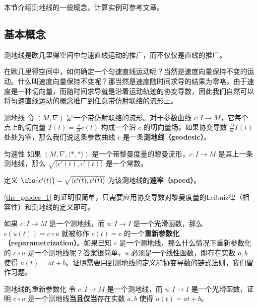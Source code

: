 

本节介绍测地线的一般概念，计算实例可参考文章。

\subsection{基本概念}

测地线是欧几里得空间中匀速直线运动的推广，而不仅仅是直线的推广。

在欧几里得空间中，如何确定一个匀速直线运动呢？当然是速度向量保持不变的运动。什么叫速度向量保持不变呢？那当然是速度随时间求导的结果为零咯。由于速度是一种切向量，而随时间求导就是沿着运动轨迹的协变导数，因此我们自然可以将匀速直线运动的概念推广到任意带仿射联络的流形上。

\begin{definition}{测地线}
令 $(M, \nabla)$ 是一个带仿射联络的流形。对于参数曲线 $c:I\to M$，它每个点上的切向量 $T(t)=\frac{\dd}{\dd t}c(t)$ 构成一个沿 $c$ 的切向量场。如果协变导数 $\frac{D}{\dd t}T(t)$ 处处为零，那么我们说这条参数曲线 $c$ 是一条\textbf{测地线（geodesic）}。
\end{definition}

\begin{theorem}{匀速性}\label{the_geodes_1}
如果 $(M, \nabla,  \langle *, * \rangle )$ 是一个带黎曼度量的黎曼流形，$c:I\to M$ 是其上一条测地线，那么 $\sqrt{ \langle c'(t), c'(t) \rangle }$ 是一个常数。

定义 $\abs{c'(t)}=\sqrt{ \langle c'(t), c'(t) \rangle }$ 为该测地线的\textbf{速率（speed）}。
\end{theorem}

\autoref{the_geodes_1} 的证明很简单，只需要应用协变导数对黎曼度量的Leibniz律（相容性）和测地线的定义即可。



如果 $c:I\to M$ 是一个测地线，而 $u:I\to I$ 是一个光滑函数，那么 $c(u(t))=c\circ u$ 就被称作 $c(t)=c$ 的一个\textbf{重新参数化（reparametrization）}。如果已知 $c$ 是一个测地线，那么什么情况下重新参数化的 $c\circ u$ 是一个测地线呢？答案很简单，$u$ 必须是一个线性函数，即存在实数 $a, b$ 使得 $u(t)=at+b$。证明需要用到测地线的定义和协变导数的链式法则，我们留作习题。

\begin{exercise}{测地线的重新参数化}
令 $c:I\to M$ 是一个测地线，而 $u:I\to I$ 是一个光滑函数，证明 $c\circ u$ 是一个测地线\textbf{当且仅当}存在实数 $a, b$ 使得 $u(t)=at+b$。
\end{exercise}

